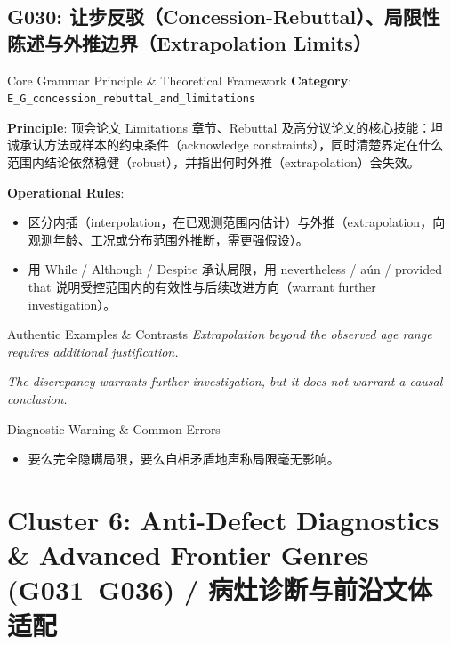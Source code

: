 \subsection{G030: 让步反驳（Concession-Rebuttal）、局限性陈述与外推边界（Extrapolation Limits）}\label{sec:rule:G030}
\begin{ConceptBox}{Core Grammar Principle \& Theoretical Framework}
\textbf{Category}: \texttt{E\_G\_concession\_rebuttal\_and\_limitations}\par\vspace{3pt}
\textbf{Principle}: 顶会论文 Limitations 章节、Rebuttal 及高分议论文的核心技能：坦诚承认方法或样本的约束条件（acknowledge constraints），同时清楚界定在什么范围内结论依然稳健（robust），并指出何时外推（extrapolation）会失效。\par\vspace{4pt}
\textbf{Operational Rules}:
\begin{itemize}[leftmargin=1.5em, itemsep=1pt]
  \item 区分内插（interpolation，在已观测范围内估计）与外推（extrapolation，向观测年龄、工况或分布范围外推断，需更强假设）。
  \item 用 While / Although / Despite 承认局限，用 nevertheless / aún / provided that 说明受控范围内的有效性与后续改进方向（warrant further investigation）。
\end{itemize}
\end{ConceptBox}
\begin{ExampleBox}{Authentic Examples \& Contrasts}
\textit{Extrapolation beyond the observed age range requires additional justification.}\par\vspace{2pt}
\textit{The discrepancy warrants further investigation, but it does not warrant a causal conclusion.}\par\vspace{2pt}
\end{ExampleBox}
\begin{TipBox}{Diagnostic Warning \& Common Errors}
\begin{itemize}[leftmargin=1.5em, itemsep=1pt]
  \item 要么完全隐瞒局限，要么自相矛盾地声称局限毫无影响。
\end{itemize}
\end{TipBox}
\vspace{6pt}
\section{Cluster 6: Anti-Defect Diagnostics \& Advanced Frontier Genres (G031--G036) / 病灶诊断与前沿文体适配}
